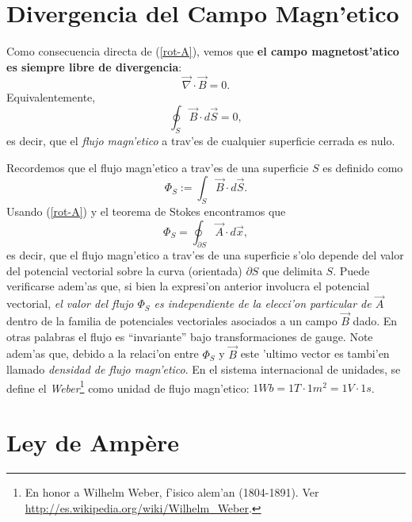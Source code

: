 \section{Divergencia del Campo Magn'etico}

Como consecuencia directa de (\ref{rot-A}), vemos que \textbf{el campo magnetost'atico
es siempre libre de divergencia}:
\begin{equation}
 \boxed{\vec{\nabla}\cdot\vec{B}=0.} \label{divB}
\end{equation}
Equivalentemente,
\begin{equation}
 \oint_S\vec{B}\cdot d\vec{S}=0,
\end{equation}
es decir, que el \textit{flujo magn'etico} a trav'es de cualquier superficie cerrada es nulo.

Recordemos que el flujo magn'etico a trav'es de una superficie $S$ es definido
como
\begin{equation}
 \Phi_S:= \int_S\vec{B}\cdot d\vec{S}.
\end{equation}
Usando (\ref{rot-A}) y el teorema de Stokes encontramos que
\begin{equation}\label{PAdx}
 \Phi_S=\oint_{\partial S}\vec{A}\cdot d\vec{x},
\end{equation}
es decir, que el flujo magn'etico a trav'es de una superficie s'olo depende del
valor del potencial vectorial sobre la curva (orientada) $\partial S$ que delimita $S$.
Puede verificarse adem'as que, si bien la expresi'on anterior involucra el
potencial vectorial, \textit{el valor del flujo $\Phi_S$ es independiente de la
elecci'on particular de $\vec{A}$} dentro de la familia de potenciales
vectoriales asociados a un campo $\vec B$ dado. En otras palabras el flujo es
``invariante'' bajo transformaciones de gauge. Note adem'as que, debido a la
relaci'on entre $\Phi_S$ y $\vec{B}$ este 'ultimo vector es tambi'en llamado
\textit{densidad de flujo magn'etico}. En el sistema internacional de unidades, se define el \textit{Weber}\footnote{En honor a Wilhelm Weber, f'isico alem'an (1804-1891). Ver \url{http://es.wikipedia.org/wiki/Wilhelm_Weber}.} como unidad de flujo magn'etico: $1Wb=1T\cdot 1m^2=1V\cdot 1s$.

\section{Ley de Amp\`ere}

